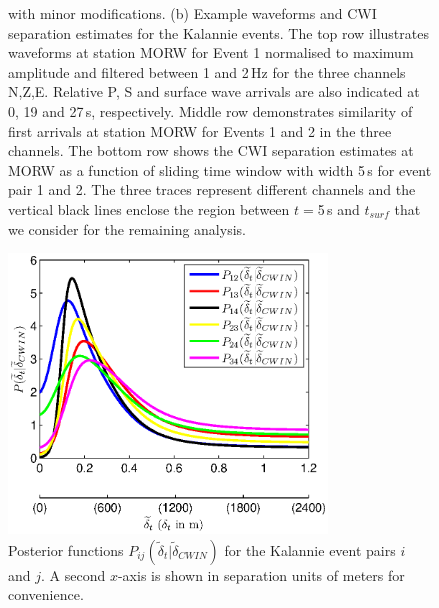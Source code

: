 \documentclass[grl]{agutex}
\begin{document}
\begin{figure}
{\citet{dr_Dawson08a} with minor modifications. (b) Example waveforms and CWI separation estimates
for the Kalannie events. The top row illustrates waveforms at station MORW for Event 1 normalised to maximum
amplitude and filtered between 1 and 2\,Hz for the three channels N,Z,E. Relative P, S and surface wave arrivals are also
indicated at 0, 19 and 27\,s, respectively. Middle row demonstrates similarity of first arrivals at station MORW for Events 1 and 2 in
the three channels. The bottom row shows the CWI separation estimates at MORW
as a function of sliding time window with width 5\,s for event pair 1 and 2. The three traces
represent different channels and the vertical black lines
enclose the region between $t=$5\,s and $t_{surf}$ that we consider for the remaining analysis.}
\label{fig:-Kalannie-map}
\end{figure}


\begin{figure}
\noindent\includegraphics[width=20pc]{./diags/CopiedFromThesis/Kalannie_Posteriors_timeclip_1to2Hz_tw5.eps}
\caption{Posterior functions
$P_{ij}(\widetilde{\delta}_{t}|\widetilde{\delta}_{CWIN})$ for the
Kalannie event pairs $i$ and $j$. A second $x$-axis is shown in
separation units of meters for convenience.}
\label{fig:Kalannie-CWI-Posteriors}
\end{figure}
\end{document}
